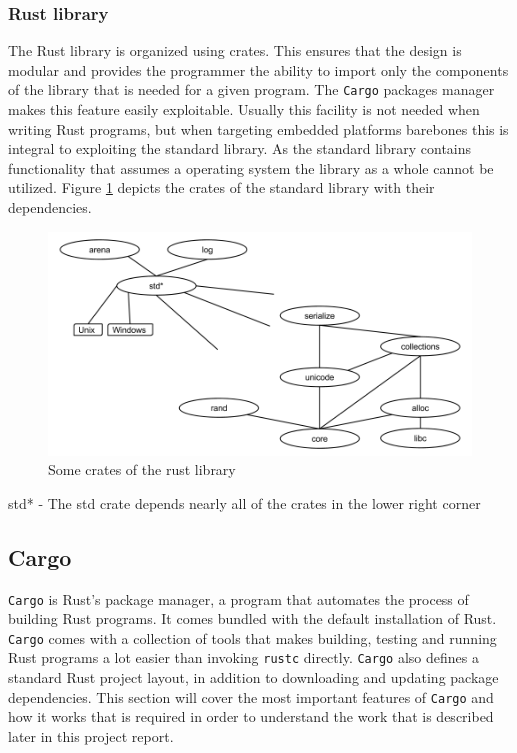 \subsubsection{Rust library}

The Rust library is organized using crates.
This ensures that the design is modular and provides the programmer the ability to import only the components of the library that is needed for a given program.
The \texttt{Cargo} packages manager makes this feature easily exploitable.
Usually this facility is not needed when writing Rust programs, but when targeting embedded platforms barebones  this is integral to exploiting the standard library.
As the standard library contains functionality that assumes a operating system the library as a whole cannot be utilized.
Figure \ref{fig:rust:librust} depicts the crates of the standard library with their dependencies.

\begin{figure}[H]
  \begin{center}
    \includegraphics[scale=0.3]{figures/background/rust/rust-lib.png}
  \end{center}
  \caption{Some crates of the rust library}
  \label{fig:rust:librust}
\end{figure}
std* - The std crate depends nearly all of the crates in the lower right corner

\subsection{Cargo}
\label{sec:cargo}

\texttt{Cargo} is Rust's package manager, a program that automates the process of building Rust programs.
It comes bundled with the default installation of Rust.
\texttt{Cargo} comes with a collection of tools that makes building, testing and running Rust programs a lot easier than invoking \texttt{rustc} directly.
\texttt{Cargo} also defines a standard Rust project layout, in addition to downloading and updating package dependencies.
This section will cover the most important features of \texttt{Cargo} and how it works that is required in order to understand the work that is described later in this project report.

